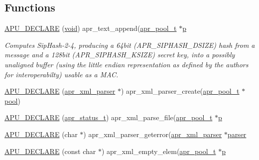 \subsection*{Functions}
\begin{DoxyCompactItemize}
\item 
\hyperlink{group__APR__Util__XML_ga9d9c232e221fd44968e0ceb7708839b6}{A\+P\+U\+\_\+\+D\+E\+C\+L\+A\+RE} (\hyperlink{group__MOD__ISAPI_gacd6cdbf73df3d9eed42fa493d9b621a6}{void}) apr\+\_\+text\+\_\+append(\hyperlink{structapr__pool__t}{apr\+\_\+pool\+\_\+t} $\ast$\hyperlink{group__APACHE__CORE__MPM_ga5cd91701e5c167f2b1a38e70ab57817e}{p}
\begin{DoxyCompactList}\small\item\em Computes Sip\+Hash-\/2-\/4, producing a 64bit (A\+P\+R\+\_\+\+S\+I\+P\+H\+A\+S\+H\+\_\+\+D\+S\+I\+ZE) hash from a message and a 128bit (A\+P\+R\+\_\+\+S\+I\+P\+H\+A\+S\+H\+\_\+\+K\+S\+I\+ZE) secret key, into a possibly unaligned buffer (using the little endian representation as defined by the authors for interoperabilty) usable as a M\+AC. \end{DoxyCompactList}\item 
\hyperlink{group__APR__Util__XML_ga1818ae6fe9e2acebf10006bd3fc7197a}{A\+P\+U\+\_\+\+D\+E\+C\+L\+A\+RE} (\hyperlink{structapr__xml__parser}{apr\+\_\+xml\+\_\+parser} $\ast$) apr\+\_\+xml\+\_\+parser\+\_\+create(\hyperlink{structapr__pool__t}{apr\+\_\+pool\+\_\+t} $\ast$\hyperlink{group__APR__XLATE_gabb3cd978f04c73d0b763c391e9bfde73}{pool})
\item 
\hyperlink{group__APR__Util__XML_ga4f95eb2fce8f447db01a30585adbd6dc}{A\+P\+U\+\_\+\+D\+E\+C\+L\+A\+RE} (\hyperlink{group__apr__errno_gaa5105fa83cc322f09382292db8b47593}{apr\+\_\+status\+\_\+t}) apr\+\_\+xml\+\_\+parse\+\_\+file(\hyperlink{structapr__pool__t}{apr\+\_\+pool\+\_\+t} $\ast$\hyperlink{group__APACHE__CORE__MPM_ga5cd91701e5c167f2b1a38e70ab57817e}{p}
\item 
\hyperlink{group__APR__Util__XML_ga8b01a0547aa3999ba8e369dd8e14b106}{A\+P\+U\+\_\+\+D\+E\+C\+L\+A\+RE} (char $\ast$) apr\+\_\+xml\+\_\+parser\+\_\+geterror(\hyperlink{structapr__xml__parser}{apr\+\_\+xml\+\_\+parser} $\ast$\hyperlink{group__APR__Util__XML_ga770a26ab91fad38f2253d5450d6e600e}{parser}
\item 
\hyperlink{group__APR__Util__XML_ga8cc8fd940d94425cc7631fa474603b91}{A\+P\+U\+\_\+\+D\+E\+C\+L\+A\+RE} (const char $\ast$) apr\+\_\+xml\+\_\+empty\+\_\+elem(\hyperlink{structapr__pool__t}{apr\+\_\+pool\+\_\+t} $\ast$\hyperlink{group__APACHE__CORE__MPM_ga5cd91701e5c167f2b1a38e70ab57817e}{p}
\end{DoxyCompactItemize}
